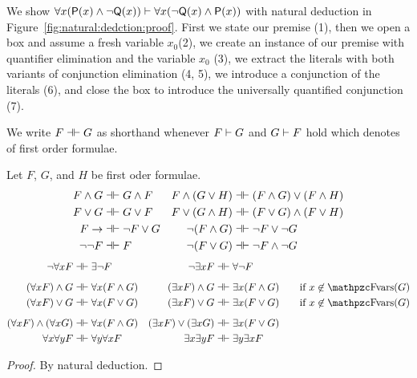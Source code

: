 \begin{example}We show \( \forall x (\mathsf{P}(x)\land\lnot\mathsf{Q}(x)) \vdash \forall x(\lnot\mathsf{Q}(x)\land\mathsf{P}(x)) \) with natural deduction in Figure~\vref{fig:natural:dedction:proof}.
	First we state our premise (1), then we open a box and assume a fresh variable \( x_0 \)(2),
	we create an instance of our premise with quantifier elimination and the variable \( x_0 \) (3),
	we extract the literals with both variants of conjunction elimination (4, 5),
	we introduce a conjunction of the literals (6),
	and close the box to introduce the universally quantified conjunction (7).
\end{example}

\begin{definition}
	We write \( F \dashv\vdash G \) as shorthand whenever 
	\( F \vdash G \) and \( G \vdash F \) hold
	which denotes  of first order formulae.
\end{definition}

\begin{lemma}\cite{Huth:2004:LCS:975331}
	Let \( F \), \( G \), and \( H \) be first oder formulae.
	\begin{align*}
		F \land G &\dashv\vdash G \land F 
		&
		F \land ( G \lor H) &\dashv\vdash (F\land G) \lor (F\land H)
		\\
		F \lor G &\dashv\vdash G \lor F
		&
		F \lor ( G \land H) &\dashv\vdash (F \lor G) \land (F \lor H)
		\\
		F \rightarrow &\dashv\vdash \lnot F \lor G
		&
		\lnot( F \land G) &\dashv\vdash \lnot F \lor \lnot G
		\\
		\lnot \lnot F &\dashv\vdash F
		&
		\lnot( F \lor G) &\dashv\vdash \lnot F \land \lnot G
	\end{align*}
% 
	\begin{align*}
		\lnot \forall x F &\biprove \exists \lnot F & 
		\lnot \exists x F &\biprove \forall \lnot F 
		\\[0.5em]
		(\forall x F) \land G &\biprove \forall x ( F \land G) &
		(\exists x F) \land G &\biprove \exists x ( F \land G ) 
		\tag*{if \( x\not\in\fvar(G)\)} 
		\\
		(\forall x F) \lor G &\biprove \forall x ( F \lor G) &
		(\exists x F) \lor G &\biprove \exists x ( F \lor G )
		\tag*{if \( x\not\in\fvar(G)\)} 
		\\[0.5em]
		(\forall x F) \land (\forall x G) &\biprove \forall x (F \land G) &
		(\exists x F) \lor (\exists x G) &\biprove \exists x (F \lor G)
		\\
		\forall x \forall y F &\biprove \forall y \forall x F &
		\exists x \exists y F &\biprove \exists y \exists x F
	\end{align*}
\end{lemma}
\begin{proof}
	By natural deduction.
\end{proof}